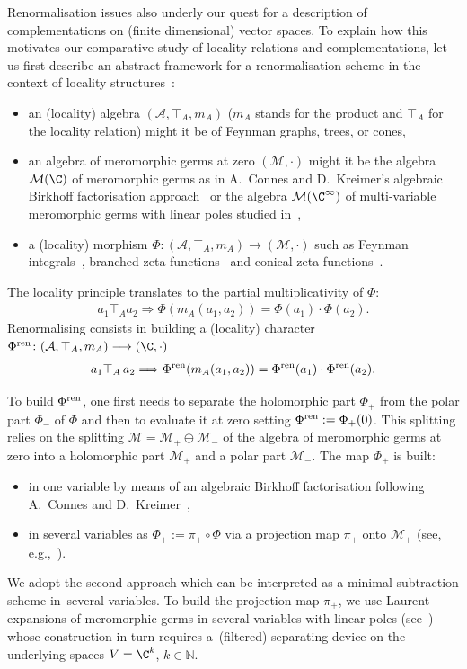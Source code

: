 \documentclass[10pt,a4paper]{amsart}
\numberwithin{equation}{section}
\newcommand{\N}{\mathbb{N}}
\begin{document}
Renormalisation issues also underly our quest for a description of complementations on (finite dimensional) vector spaces. To explain how this motivates our comparative study of locality relations and complementations, let us first describe an abstract framework for a renormalisation scheme in the context of locality structures~\cite{CGPZ1, CGPZ2}:
\begin{itemize}\itemsep=0pt
\item an (locality) algebra $ \left({\mathcal A}, \top_A, m_A\right)$ ($m_A$ stands for the product and $\top_A$ for the locality relation) might it be of Feynman graphs, trees, or cones,
\item an algebra of meromorphic germs at zero $\left({ {\mathcal M} } , \cdot\right)$ might it be the algebra ${\mathcal M}(\C)$ of meromorphic germs as in A.~Connes and D.~Kreimer's algebraic Birkhoff factorisation approach~\cite{CK} or the algebra ${\mathcal M}(\C^\infty)$ of multi-variable meromorphic germs with linear poles studied in~\cite{GPZ2},
\item a (locality) morphism $ \Phi\colon ({\mathcal A}, \top_A, m_A)
\longrightarrow({\mathcal M}, \cdot)$ such as Feynman integrals~\cite{DZ}, branched zeta functions~\cite{CGPZ3, CGPZ4} and conical zeta functions~\cite{GPZ1}.
		\end{itemize}
The locality principle translates to the partial multiplicativity of $\Phi$:
\begin{gather*}
a_1 \top_A a_2\Longrightarrow \Phi(m_A(a_1 ,a_2))= \Phi (a_1) \cdot \Phi(a_2).
\end{gather*}
Renormalising consists in building a (locality) character $\Phi^{\rm ren}\colon ({\mathcal A}, \top_A, m_A)\longrightarrow (\C, \cdot)$
%
\begin{gather*}
a_1 \top_A\, a_2\Longrightarrow \Phi^{ \rm ren}({ m_A}( a_1 ,a_2))= { \Phi}^{ \rm ren} ( a_1 ) \cdot{ \Phi}^{\rm ren}(a_2).
\end{gather*}
	

 To build $ \Phi^{ \rm ren} $, one first needs to separate the holomorphic part ${ \Phi}_+$ from the polar part ${ \Phi}_-$ of ${ \Phi}$ and then to evaluate it at zero setting $\Phi^{\rm ren}:= \Phi_+(0)$. This splitting relies on the splitting $ {\mathcal M} = {\mathcal M}_+\oplus {\mathcal M}_-$ of the algebra of meromorphic germs at zero into a holomorphic part $ {\mathcal M}_+$ and a polar part ${\mathcal M}_-$. The map $\Phi_+$ is built:
\begin{itemize}\itemsep=0pt
\item in one variable by means of an algebraic Birkhoff factorisation following A.~Connes and
D.~Kreimer~\cite{CK},
\item in several variables as $\Phi_+:=\pi_+\circ \Phi$ via a projection map $\pi_+$ onto
${\mathcal M}_+$ (see, e.g.,~\cite{CGPZ2}).
\end{itemize}
			We adopt the second approach which can be interpreted as a minimal subtraction scheme in~several variables. To build the projection map $\pi_+$, we use Laurent expansions of meromorphic germs in several variables with linear poles (see~\cite{GPZ2}) whose construction in turn requires a~(filtered) separating device on the underlying spaces $V=\C^k$, $k\in \N$.
			
\end{document}
